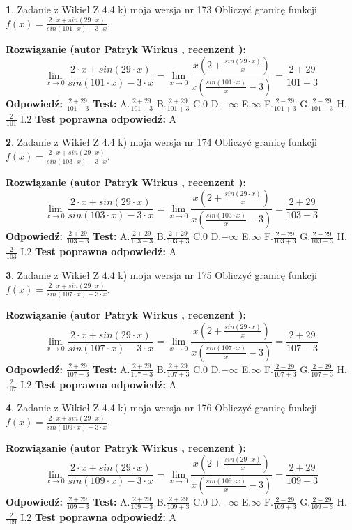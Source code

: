 \documentclass[12pt, a4paper]{article}
\theoremstyle{definition} %
\newtheorem{zad}{}
\newcommand{\zadStart}[1]{\begin{zad}#1\newline}
\newcommand{\zadStop}{\end{zad}}
\newcommand{\rozwStart}[2]{\noindent \textbf{Rozwiązanie (autor #1 , recenzent #2): }\newline}
\newcommand{\rozwStop}{\newline}
\newcommand{\odpStart}{\noindent \textbf{Odpowiedź:}\newline}
\newcommand{\odpStop}{\newline}
\newcommand{\testStart}{\noindent \textbf{Test:}\newline}
\newcommand{\testStop}{\newline}
\newcommand{\kluczStart}{\noindent \textbf{Test poprawna odpowiedź:}\newline}
\newcommand{\kluczStop}{\newline}
\begin{document}
\zadStart{Zadanie z Wikieł Z 4.4 k) moja wersja nr 173}
Obliczyć granicę funkcji $f(x)=\frac{2\cdot x +sin(29\cdot x)}{sin(101\cdot x) -3\cdot x}$.
\zadStop
\rozwStart{Patryk Wirkus}{}
$$\lim\limits_{x\to 0}\frac{2\cdot x +sin(29\cdot x)}{sin(101\cdot x) -3\cdot x}
=\lim\limits_{x\to 0}\frac{x(2+\frac{sin(29\cdot x)}{x})}{x(\frac{sin(101\cdot x)}{x}-3)}
=\frac{2+29}{101-3}$$
\rozwStop
\odpStart
$\frac{2+29}{101-3}$
\odpStop
\testStart
A.$\frac{2+29}{101-3}$
B.$\frac{2+29}{101+3}$
C.$0$
D.$-\infty$
E.$\infty$
F.$\frac{2-29}{101+3}$
G.$\frac{2-29}{101-3}$
H.$\frac{2}{101}$
I.$2$
\testStop
\kluczStart
A
\kluczStop



\zadStart{Zadanie z Wikieł Z 4.4 k) moja wersja nr 174}
Obliczyć granicę funkcji $f(x)=\frac{2\cdot x +sin(29\cdot x)}{sin(103\cdot x) -3\cdot x}$.
\zadStop
\rozwStart{Patryk Wirkus}{}
$$\lim\limits_{x\to 0}\frac{2\cdot x +sin(29\cdot x)}{sin(103\cdot x) -3\cdot x}
=\lim\limits_{x\to 0}\frac{x(2+\frac{sin(29\cdot x)}{x})}{x(\frac{sin(103\cdot x)}{x}-3)}
=\frac{2+29}{103-3}$$
\rozwStop
\odpStart
$\frac{2+29}{103-3}$
\odpStop
\testStart
A.$\frac{2+29}{103-3}$
B.$\frac{2+29}{103+3}$
C.$0$
D.$-\infty$
E.$\infty$
F.$\frac{2-29}{103+3}$
G.$\frac{2-29}{103-3}$
H.$\frac{2}{103}$
I.$2$
\testStop
\kluczStart
A
\kluczStop



\zadStart{Zadanie z Wikieł Z 4.4 k) moja wersja nr 175}
Obliczyć granicę funkcji $f(x)=\frac{2\cdot x +sin(29\cdot x)}{sin(107\cdot x) -3\cdot x}$.
\zadStop
\rozwStart{Patryk Wirkus}{}
$$\lim\limits_{x\to 0}\frac{2\cdot x +sin(29\cdot x)}{sin(107\cdot x) -3\cdot x}
=\lim\limits_{x\to 0}\frac{x(2+\frac{sin(29\cdot x)}{x})}{x(\frac{sin(107\cdot x)}{x}-3)}
=\frac{2+29}{107-3}$$
\rozwStop
\odpStart
$\frac{2+29}{107-3}$
\odpStop
\testStart
A.$\frac{2+29}{107-3}$
B.$\frac{2+29}{107+3}$
C.$0$
D.$-\infty$
E.$\infty$
F.$\frac{2-29}{107+3}$
G.$\frac{2-29}{107-3}$
H.$\frac{2}{107}$
I.$2$
\testStop
\kluczStart
A
\kluczStop



\zadStart{Zadanie z Wikieł Z 4.4 k) moja wersja nr 176}
Obliczyć granicę funkcji $f(x)=\frac{2\cdot x +sin(29\cdot x)}{sin(109\cdot x) -3\cdot x}$.
\zadStop
\rozwStart{Patryk Wirkus}{}
$$\lim\limits_{x\to 0}\frac{2\cdot x +sin(29\cdot x)}{sin(109\cdot x) -3\cdot x}
=\lim\limits_{x\to 0}\frac{x(2+\frac{sin(29\cdot x)}{x})}{x(\frac{sin(109\cdot x)}{x}-3)}
=\frac{2+29}{109-3}$$
\rozwStop
\odpStart
$\frac{2+29}{109-3}$
\odpStop
\testStart
A.$\frac{2+29}{109-3}$
B.$\frac{2+29}{109+3}$
C.$0$
D.$-\infty$
E.$\infty$
F.$\frac{2-29}{109+3}$
G.$\frac{2-29}{109-3}$
H.$\frac{2}{109}$
I.$2$
\testStop
\kluczStart
A
\kluczStop
\end{document}
